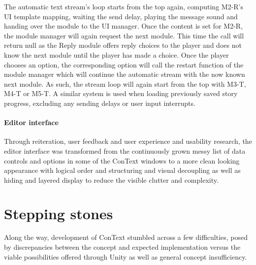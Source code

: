 The automatic text stream's loop starts from the top again, computing M2-R's UI template mapping, waiting the send delay, playing the message sound and handing over the module to the UI manager. Once the content is set for M2-R, the module manager will again request the next module. This time the call will return null as the Reply module offers reply choices to the player and does not know the next module until the player has made a choice. Once the player chooses an option, the corresponding option will call the restart function of the module manager which will continue the automatic stream with the now known next module. 
As such, the stream loop will again start from the top with M3-T, M4-T or M5-T. 
A similar system is used when loading previously saved story progress, excluding any sending delays or user input interrupts. 
\paragraph{Editor interface} Through reiteration, user feedback and user experience and usability research, the editor interface was transformed from the continuously grown messy list of data controls and options in some of the ConText windows to a more clean looking appearance with logical order and structuring and visual decoupling as well as hiding and layered display to reduce the visible clutter and complexity.

\section{Stepping stones}
Along the way, development of ConText stumbled across a few difficulties, posed by discrepancies between the concept and expected implementation versus the viable possibilities offered through Unity as well as general concept insufficiency. 
